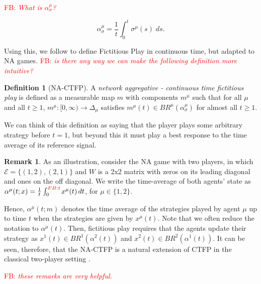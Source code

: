 \documentclass{article}
\theoremstyle{definition}
\newtheorem{definition}{Definition}
\newtheorem*{remark}{Remark}
\newcommand{\fb}[1]{\textcolor{red}{FB: \textit{#1}}}
\newcommand{\edgeset}{\mathcal{E}}
\newcommand{\weightset}{W}
\newcommand{\xmu}{x^{\mu}}
\newcommand{\refmu}{\sigma^{\mu}}
\newcommand{\avgref}[1]{\alpha_\sigma^{#1}}
\begin{document}
  \fb{What is $\avgref{\mu}$?}

  \begin{equation}
    \avgref{\mu} = \frac{1}{t} \int_0^t \refmu(s) \; ds.
  \end{equation}

  Using this, we follow \cite{Ewerhart,Harris}
  to define
  Fictitious Play in continuous time, but adapted
  to NA games.
  \fb{is there any way we can make the following definition more intuitive?}
  \begin{definition}[NA-CTFP]
    A {\em network aggregative - continuous time fictitious play} is
    defined as a measurable map $m$ with components $m^\mu$ such that
    for all $\mu$ and all $t \geq 1$, $m^\mu: [0, \infty) \rightarrow
      \Delta_\mu$ satisfies $m^\mu(t) \in BR^\mu(\alpha_{\sigma}^\mu)$
      for almost all $t \geq 1$.
  \end{definition}

  We can think of this definition as saying that the player plays some arbitrary strategy before
  $t = 1$, but beyond this it must play a best response to the time average of its reference
  signal.
  
  \begin{remark}
    As an illustration, consider the NA game with two players, in which $\edgeset = \{(1, 2),
    (2, 1)\}$ and $\weightset$ is a 2x2 matrix with zeros on its leading diagonal and ones on
    the off diagonal. We write the time-average of both agents' state as
%  
 $     \alpha^\mu(t; x) = \frac{1}{t} \int_0^{\fb{t}} \xmu(t) \, dt$, for $\mu \in \{1, 2\}$.
    
   Hence, $\alpha^\mu(t; m)$ denotes the time average of the
   strategies played by agent $\mu$ up to time $t$ when the strategies
   are given by $\xmu(t)$. Note that we often reduce the notation to
   $\alpha^\mu(t)$. Then, fictitious play requires that the agents
   update their strategy as $x^1(t) \in BR^1(\alpha^2(t))$ and $x^2(t)
   \in BR^2(\alpha^1(t))$. It can be seen, therefore, that the NA-CTFP
   is a natural extension of CTFP in the classical two-player setting
   \cite{}.
  \end{remark}

  \fb{these remarks are very helpful.}
\end{document}
